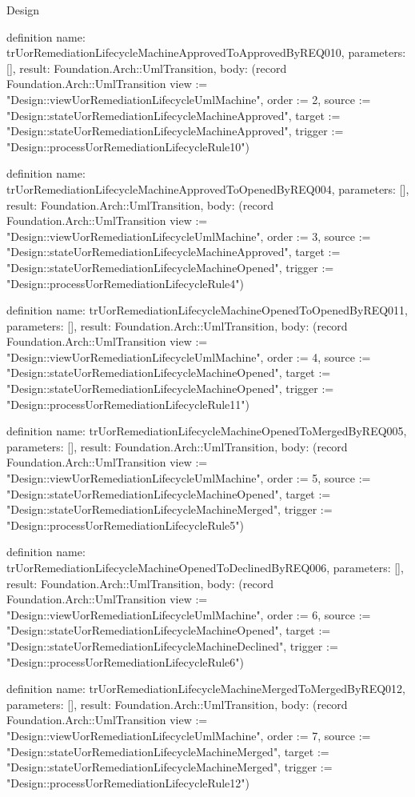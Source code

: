 \begin{lexlean}{Design}
\begin{semanticmodule}
definition{
  name: trUorRemediationLifecycleMachineApprovedToApprovedByREQ010,
  parameters: [],
  result: Foundation.Arch::UmlTransition,
  body: (record Foundation.Arch::UmlTransition {view := "Design::viewUorRemediationLifecycleUmlMachine", order := 2, source := "Design::stateUorRemediationLifecycleMachineApproved", target := "Design::stateUorRemediationLifecycleMachineApproved", trigger := "Design::processUorRemediationLifecycleRule10"})
}

definition{
  name: trUorRemediationLifecycleMachineApprovedToOpenedByREQ004,
  parameters: [],
  result: Foundation.Arch::UmlTransition,
  body: (record Foundation.Arch::UmlTransition {view := "Design::viewUorRemediationLifecycleUmlMachine", order := 3, source := "Design::stateUorRemediationLifecycleMachineApproved", target := "Design::stateUorRemediationLifecycleMachineOpened", trigger := "Design::processUorRemediationLifecycleRule4"})
}

definition{
  name: trUorRemediationLifecycleMachineOpenedToOpenedByREQ011,
  parameters: [],
  result: Foundation.Arch::UmlTransition,
  body: (record Foundation.Arch::UmlTransition {view := "Design::viewUorRemediationLifecycleUmlMachine", order := 4, source := "Design::stateUorRemediationLifecycleMachineOpened", target := "Design::stateUorRemediationLifecycleMachineOpened", trigger := "Design::processUorRemediationLifecycleRule11"})
}

definition{
  name: trUorRemediationLifecycleMachineOpenedToMergedByREQ005,
  parameters: [],
  result: Foundation.Arch::UmlTransition,
  body: (record Foundation.Arch::UmlTransition {view := "Design::viewUorRemediationLifecycleUmlMachine", order := 5, source := "Design::stateUorRemediationLifecycleMachineOpened", target := "Design::stateUorRemediationLifecycleMachineMerged", trigger := "Design::processUorRemediationLifecycleRule5"})
}

definition{
  name: trUorRemediationLifecycleMachineOpenedToDeclinedByREQ006,
  parameters: [],
  result: Foundation.Arch::UmlTransition,
  body: (record Foundation.Arch::UmlTransition {view := "Design::viewUorRemediationLifecycleUmlMachine", order := 6, source := "Design::stateUorRemediationLifecycleMachineOpened", target := "Design::stateUorRemediationLifecycleMachineDeclined", trigger := "Design::processUorRemediationLifecycleRule6"})
}

definition{
  name: trUorRemediationLifecycleMachineMergedToMergedByREQ012,
  parameters: [],
  result: Foundation.Arch::UmlTransition,
  body: (record Foundation.Arch::UmlTransition {view := "Design::viewUorRemediationLifecycleUmlMachine", order := 7, source := "Design::stateUorRemediationLifecycleMachineMerged", target := "Design::stateUorRemediationLifecycleMachineMerged", trigger := "Design::processUorRemediationLifecycleRule12"})
}


\end{semanticmodule}
\end{lexlean}
